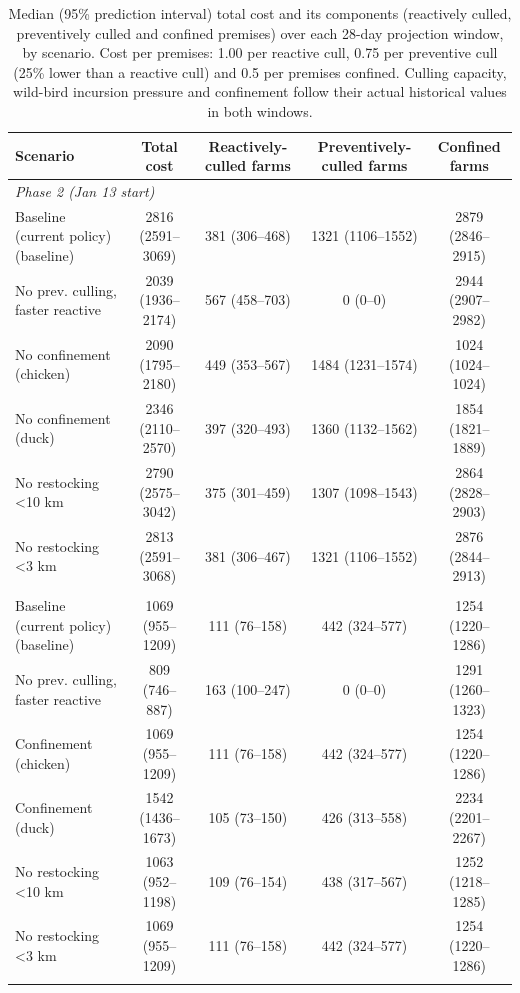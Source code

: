 \begin{table}[t]
\centering
\caption{Median (95\% prediction interval) total cost and its components
(reactively culled, preventively culled and confined premises) over each
28-day projection window, by scenario. Cost per premises: 1.00 per reactive
cull, 0.75 per preventive cull (25\% lower than a reactive cull) and 0.5
per premises confined. Culling capacity, wild-bird incursion pressure and confinement follow their actual historical values in both windows.}
\label{tab:scenario_cost_summary}
\begin{tabular}{lcccc}
\toprule
Scenario & Total cost & Reactively-culled farms & Preventively-culled farms & Confined farms \\
\midrule
\multicolumn{5}{l}{\textit{Phase 2 (Jan 13 start)}} \\
\quad Baseline (current policy) (baseline) & 2816 (2591--3069) & 381 (306--468) & 1321 (1106--1552) & 2879 (2846--2915) \\
\quad No prev. culling, faster reactive & 2039 (1936--2174) & 567 (458--703) & 0 (0--0) & 2944 (2907--2982) \\
\quad No confinement (chicken) & 2090 (1795--2180) & 449 (353--567) & 1484 (1231--1574) & 1024 (1024--1024) \\
\quad No confinement (duck) & 2346 (2110--2570) & 397 (320--493) & 1360 (1132--1562) & 1854 (1821--1889) \\
\quad No restocking <10 km & 2790 (2575--3042) & 375 (301--459) & 1307 (1098--1543) & 2864 (2828--2903) \\
\quad No restocking <3 km & 2813 (2591--3068) & 381 (306--467) & 1321 (1106--1552) & 2876 (2844--2913) \\
\addlinespace
\multicolumn{5}{l}{\textit{Phase 3 (Feb 14 start)}} \\
\quad Baseline (current policy) (baseline) & 1069 (955--1209) & 111 (76--158) & 442 (324--577) & 1254 (1220--1286) \\
\quad No prev. culling, faster reactive & 809 (746--887) & 163 (100--247) & 0 (0--0) & 1291 (1260--1323) \\
\quad Confinement (chicken) & 1069 (955--1209) & 111 (76--158) & 442 (324--577) & 1254 (1220--1286) \\
\quad Confinement (duck) & 1542 (1436--1673) & 105 (73--150) & 426 (313--558) & 2234 (2201--2267) \\
\quad No restocking <10 km & 1063 (952--1198) & 109 (76--154) & 438 (317--567) & 1252 (1218--1285) \\
\quad No restocking <3 km & 1069 (955--1209) & 111 (76--158) & 442 (324--577) & 1254 (1220--1286) \\
\addlinespace
\bottomrule
\end{tabular}
\end{table}

